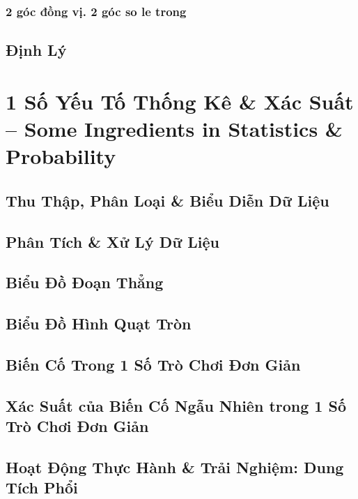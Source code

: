 \documentclass{article}
\numberwithin{equation}{section}
\begin{document}
\subsubsection{2 góc đồng vị. 2 góc so le trong}

\subsection{Định Lý}


\section{1 Số Yếu Tố Thống Kê \& Xác Suất -- Some Ingredients in Statistics \& Probability}

\subsection{Thu Thập, Phân Loại \& Biểu Diễn Dữ Liệu}

\subsection{Phân Tích \& Xử Lý Dữ Liệu}

\subsection{Biểu Đồ Đoạn Thẳng}

\subsection{Biểu Đồ Hình Quạt Tròn}

\subsection{Biến Cố Trong 1 Số Trò Chơi Đơn Giản}

\subsection{Xác Suất của Biến Cố Ngẫu Nhiên trong 1 Số Trò Chơi Đơn Giản}

\subsection{Hoạt Động Thực Hành \& Trải Nghiệm: Dung Tích Phổi}
\end{document}
